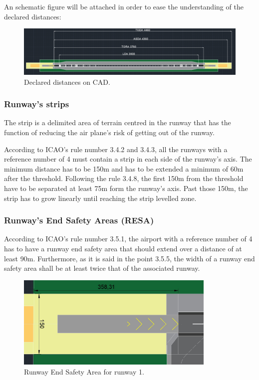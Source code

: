 			An schematic figure will be attached in order to ease the understanding of the declared distances:
			
			\begin{figure}[H]
				\centering
				\includegraphics[clip, trim=0cm 0cm 0cm 0cm, width=1\textwidth]{./images/declareddistances/pista}
				\caption{Declared distances on CAD.} %
				\label{} %
			\end{figure}
			
			\subsubsection{Runway's strips}
			The strip is a delimited area of terrain centred in the runway that has the function of reducing the air plane's risk of getting out of the runway.
			
			According to ICAO's rule number 3.4.2 and 3.4.3, all the runways with a reference number of 4 must contain a strip in each side of the runway's axis. The minimum distance has to be 150m and has to be extended a minimum of 60m after the threshold. 
			Following the rule 3.4.8, the first 150m from the threshold have to be separated at least 75m form the runway's axis. Past those 150m, the strip has to grow linearly until reaching the strip levelled zone.      
			
			\subsubsection{Runway's End Safety Areas (RESA)}
			According to ICAO's rule number 3.5.1, the airport with a reference number of 4 has to have a runway end safety area that should extend over a distance of at least 90m. Furthermore, as it is said in the point 3.5.5, the width of a runway end safety area shall be at least twice that of the associated runway. 
			
			\begin{figure}[H]
				\centering
				\includegraphics[clip, trim=0cm 0cm 0cm 0cm, width=0.85\textwidth]{./images/declareddistances/RESA}
				\caption{Runway End Safety Area for runway 1.} %
				\label{} %
			\end{figure}
		
